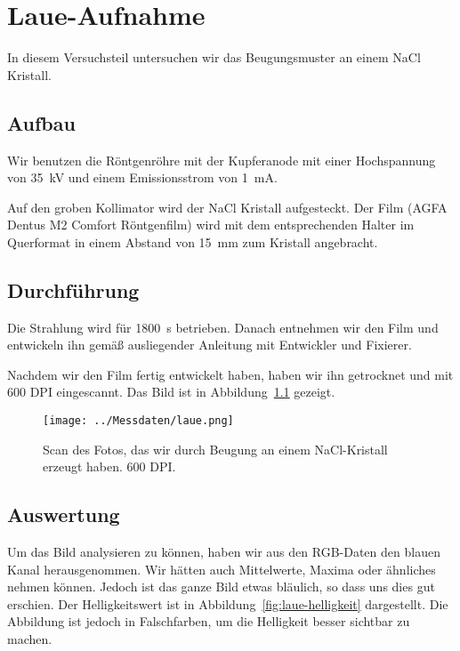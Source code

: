 \chapter{Laue-Aufnahme}

In diesem Versuchsteil untersuchen wir das Beugungsmuster an einem NaCl
Kristall.

\section{Aufbau}

Wir benutzen die Röntgenröhre mit der Kupferanode mit einer Hochspannung von
\SI{35}{\kilo\volt} und einem Emissionsstrom von \SI{1}{\milli\ampere}.

Auf den groben Kollimator wird der NaCl Kristall aufgesteckt. Der Film (AGFA
Dentus M2 Comfort Röntgenfilm) wird mit dem entsprechenden Halter im Querformat
in einem Abstand von \SI{15}{\milli\meter} zum Kristall angebracht.

\section{Durchführung}

Die Strahlung wird für \SI{1800}{\second} betrieben. Danach entnehmen wir den
Film und entwickeln ihn gemäß ausliegender Anleitung mit Entwickler und
Fixierer.

Nachdem wir den Film fertig entwickelt haben, haben wir ihn getrocknet und mit
600 DPI eingescannt. Das Bild ist in Abbildung~\ref{fig:laue} gezeigt.

\begin{figure}[htbp]
    \centering
    \texttt{[image: ../Messdaten/laue.png]}
    \caption{%
        Scan des Fotos, das wir durch Beugung an einem NaCl-Kristall erzeugt
        haben. 600 DPI.
    }
    \label{fig:laue}
\end{figure}

\section{Auswertung}

Um das Bild analysieren zu können, haben wir aus den RGB-Daten den blauen Kanal
herausgenommen. Wir hätten auch Mittelwerte, Maxima oder ähnliches nehmen
können. Jedoch ist das ganze Bild etwas bläulich, so dass uns dies gut
erschien. Der Helligkeitswert ist in Abbildung~\ref{fig:laue-helligkeit}
dargestellt. Die Abbildung ist jedoch in Falschfarben, um die Helligkeit besser
sichtbar zu machen.

